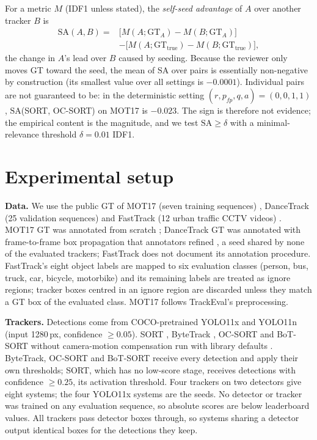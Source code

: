 \documentclass[final,times,twocolumn]{elsarticle}
\newcommand{\SA}{\mathrm{SA}}
\newcommand{\gtt}{\mathrm{GT}_{\mathrm{true}}}
\begin{document}
For a metric $M$ (IDF1 unless stated), the \emph{self-seed advantage} of $A$ over another tracker $B$ is
\begin{equation}
\begin{split}
\SA(A,B) = {} & \bigl[M(A;\mathrm{GT}_A) - M(B;\mathrm{GT}_A)\bigr] \\
 & - \bigl[M(A;\gtt) - M(B;\gtt)\bigr],
\end{split}
\end{equation}
the change in $A$'s lead over $B$ caused by seeding. Because the reviewer only moves GT toward the seed,
the mean of $\SA$ over pairs is essentially non-negative by construction (its smallest value over all
settings is $-0.0001$). Individual pairs are not guaranteed to be: in the deterministic setting
$(r, p_{fp}, q, a) = (0, 0, 1, 1)$, $\SA$(SORT, OC-SORT) on MOT17 is $-0.023$. The sign is therefore not
evidence; the empirical content is the magnitude, and we test $\SA \ge \delta$ with a minimal-relevance
threshold $\delta = 0.01$ IDF1.

\section{Experimental setup}
\label{sec:setup}

\textbf{Data.} We use the public GT of MOT17 (seven training sequences) \cite{milan2016mot16,dendorfer2021motchallenge},
DanceTrack (25 validation sequences) \cite{sun2022dancetrack} and FastTrack (12 urban traffic CCTV
videos) \cite{hashempoor2025fasttracker}. MOT17 GT was annotated from scratch \cite{milan2016mot16};
DanceTrack GT was annotated with frame-to-frame box propagation that annotators refined
\cite{sun2022dancetrack}, a seed shared by none of the evaluated trackers; FastTrack does not document its
annotation procedure. FastTrack's eight object labels are mapped to six evaluation classes (person, bus,
truck, car, bicycle, motorbike) and its remaining labels are treated as ignore regions; tracker boxes
centred in an ignore region are discarded unless they match a GT box of the evaluated class. MOT17 follows TrackEval's preprocessing.

\textbf{Trackers.} Detections come from COCO-pretrained YOLO11x and YOLO11n \cite{ultralytics2024yolo11}
(input 1280\,px, confidence $\ge 0.05$). SORT \cite{bewley2016sort}, ByteTrack \cite{zhang2022bytetrack},
OC-SORT \cite{cao2023ocsort} and BoT-SORT without camera-motion compensation \cite{aharon2022botsort} run
with library defaults \cite{roboflow2025trackers}. ByteTrack, OC-SORT and BoT-SORT receive every detection
and apply their own thresholds; SORT, which has no low-score stage, receives detections with confidence
$\ge 0.25$, its activation threshold. Four trackers on two detectors give eight systems; the four YOLO11x
systems are the seeds. No detector or tracker was trained on any evaluation sequence, so absolute scores
are below leaderboard values. All trackers pass detector boxes through, so systems sharing a detector
output identical boxes for the detections they keep.
\end{document}
